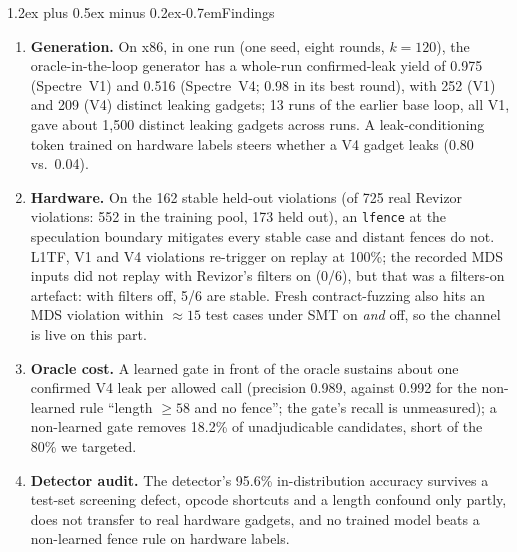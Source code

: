 \documentclass[conference]{IEEEtran}
\makeatletter
\renewcommand\paragraph{\@startsection{paragraph}{4}{\z@}%
  {1.2ex plus 0.5ex minus 0.2ex}{-0.7em}{\normalfont\normalsize\bfseries}}
\makeatother
\begin{document}
\paragraph{Findings}
\begin{enumerate}[itemsep=1pt,leftmargin=1.4em]
  \item \textbf{Generation.} On x86, in one run (one seed, eight rounds,
    $k{=}120$), the oracle-in-the-loop generator has a whole-run
    confirmed-leak yield of 0.975 (Spectre~V1) and 0.516 (Spectre~V4; 0.98 in
    its best round), with 252 (V1) and 209 (V4) distinct leaking gadgets; 13
    runs of the earlier base loop, all V1, gave about 1,500 distinct leaking
    gadgets across runs. A leak-conditioning token trained on
    hardware labels steers whether a V4 gadget leaks (0.80 vs.\ 0.04).
  \item \textbf{Hardware.} On the 162 stable held-out violations (of 725 real
    Revizor violations: 552 in the training pool, 173 held out), an
    \texttt{lfence}
    at the speculation boundary mitigates every stable case and distant fences
    do not. L1TF, V1 and V4 violations re-trigger on replay at 100\%; the
    recorded MDS inputs did not replay with Revizor's filters on (0/6), but
    that was a filters-on artefact: with filters off, 5/6 are stable. Fresh
    contract-fuzzing also hits an MDS
    violation within ${\approx}15$ test cases under SMT on \emph{and} off, so
    the channel is live on this part.
  \item \textbf{Oracle cost.} A learned gate in front of the oracle sustains
    about one confirmed V4 leak per allowed call (precision 0.989, against
    0.992 for the non-learned rule ``length $\ge 58$ and no fence''; the
    gate's recall is unmeasured); a non-learned gate removes 18.2\% of unadjudicable
    candidates, short of the 80\% we targeted.
  \item \textbf{Detector audit.} The detector's 95.6\% in-distribution accuracy
    survives a test-set screening defect, opcode shortcuts and a length
    confound only partly, does not transfer to real hardware gadgets, and no
    trained model beats a non-learned fence rule on hardware labels.
\end{enumerate}
\end{document}

